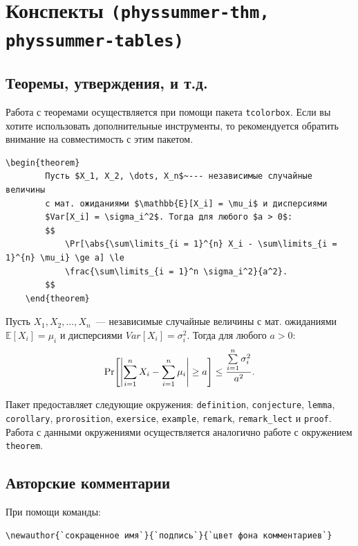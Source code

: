 \section{Конспекты \texttt{(physsummer-thm, physsummer-tables)}}

\subsection{Теоремы, утверждения, и т.д.}

Работа с теоремами осуществляется при помощи пакета \texttt{tcolorbox}. Если вы хотите использовать
дополнительные инструменты, то рекомендуется обратить внимание на совместимость с этим пакетом.

\begin{lstlisting}[gobble = 3]
    \begin{theorem}
        Пусть $X_1, X_2, \dots, X_n$~--- независимые случайные величины
        с мат. ожиданиями $\mathbb{E}[X_i] = \mu_i$ и дисперсиями
        $Var[X_i] = \sigma_i^2$. Тогда для любого $a > 0$:
        $$
            \Pr[\abs{\sum\limits_{i = 1}^{n} X_i - \sum\limits_{i = 1}^{n} \mu_i} \ge a] \le 
            \frac{\sum\limits_{i = 1}^n \sigma_i^2}{a^2}.
        $$
    \end{theorem}
\end{lstlisting}

\begin{theorem}
    Пусть $X_1, X_2, \dots, X_n$~--- независимые случайные величины с мат. ожиданиями $\mathbb{E}[X_i] =
    \mu_i$ и дисперсиями $Var[X_i] = \sigma_i^2$. Тогда для любого $a > 0$:
    $$
        \Pr[\abs{\sum\limits_{i = 1}^{n} X_i - \sum\limits_{i = 1}^{n} \mu_i} \ge a] \le
        \frac{\sum\limits_{i = 1}^n \sigma_i^2}{a^2}.
    $$
\end{theorem}

Пакет предоставляет следующие окружения: \texttt{definition}, \texttt{conjecture}, \texttt{lemma},
\texttt{corollary}, \texttt{prorosition}, \texttt{exersice}, \texttt{example}, \texttt{remark},
\texttt{remark\_lect} и \texttt{proof}. Работа с данными окружениями осуществляется аналогично работе с
окружением \texttt{theorem}.


\subsection{Авторские комментарии}
\label{sec:authors}

При помощи команды:
\begin{lstlisting}[gobble = 3]
    \newauthor{`сокращенное имя`}{`подпись`}{`цвет фона комментариев`}
\end{lstlisting}

